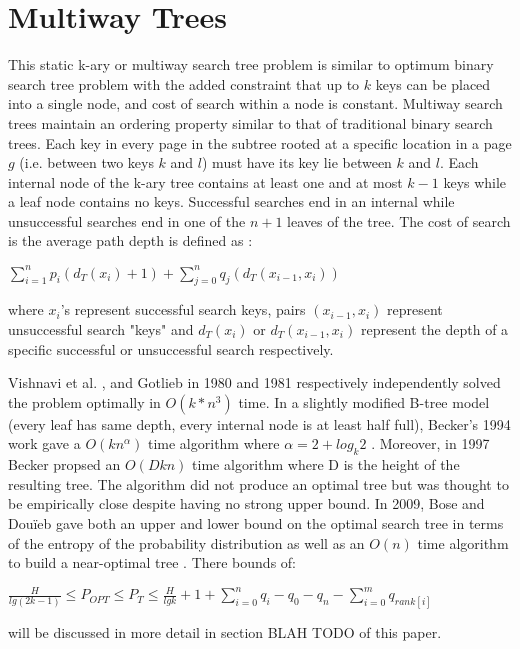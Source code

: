 \documentclass[letterpaper,12pt,titlepage,oneside,final]{book}
\theoremstyle{plain}
\begin{document}
\section{Multiway Trees} 

This static k-ary or multiway search tree problem is similar to optimum binary search tree problem with the added constraint that up to $k$ keys can be placed into a single node, and cost of search within a node is constant. Multiway search trees maintain an ordering property similar to that of traditional binary search trees. Each key in every page in the subtree rooted at a specific location in a page $g$ (i.e. between two keys $k$ and $l$) must have its key lie between $k$ and $l$. Each internal node of the k-ary tree contains at least one and at most $k-1$ keys while a leaf node contains no keys. Successful searches end in an internal while unsuccessful searches end in one of the $n+1$ leaves of the tree. The cost of search is the average path depth is defined as :

\begin{center}
$\sum_{i=1}^{n} p_i(d_T(x_i)+1) + \sum_{j=0}^{n} q_j(d_T(x_{i-1},x_i))$
\end{center}

where $x_i$'s represent successful search keys, pairs $(x_{i-1},x_i)$ represent unsuccessful search "keys" and $d_T(x_i)$  or $d_T(x_{i-1},x_i)$ represent the depth of a specific successful or unsuccessful search respectively.

Vishnavi et al. \cite{vaishnavi1980optimum}, and Gotlieb  \cite{gotlieb1981optimal} in 1980 and 1981 respectively independently solved the problem optimally in $O(k*n^3)$ time. In a slightly modified B-tree model (every leaf has same depth, every internal node is at least half full), Becker's 1994 work gave a $O(kn^{\alpha})$ time algorithm where $\alpha=2+log_k 2$ \cite{becker1994new}. Moreover, in 1997 Becker propsed an $O(Dkn)$ time algorithm where D is the height of the resulting tree\cite{becker1997construction}. The algorithm did not produce an optimal tree but was thought to be empirically close despite having no strong upper bound. In 2009, Bose and Dou\"{i}eb gave both an upper and lower bound on the optimal search tree in terms of the entropy of the probability distribution as well as an $O(n)$ time algorithm to build a near-optimal tree \cite{bose2009efficient}. There bounds of:
\begin{center}
$\frac{H}{lg(2k-1)} \leq P_{OPT} \leq P_T \leq \frac{H}{lg k} + 1 + \sum_{i=0}^n q_i - q_0 - q_n - \sum_{i=0}^m q_{rank[i]}$
\end{center}
will be discussed in more detail in section BLAH TODO of this paper.
\end{document}
